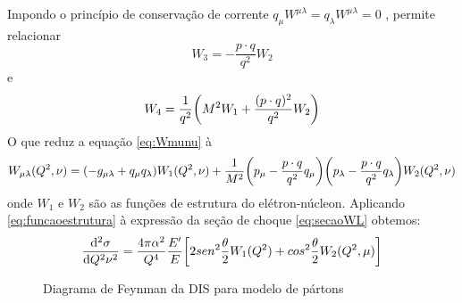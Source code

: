 Impondo o princípio de conservação de corrente $q_\mu W^{\mu\lambda} = q_ \lambda W^{\mu\lambda} = 0$ , permite relacionar
\begin{equation}
    W_ 3 = - \frac{p\cdot q}{q^2} W_ 2
\end{equation}
e
\begin{equation}
    W_ 4 = \frac{1}{q^2} \qty(M^2 W_1 + \frac{(p\cdot q) ^2}{q^2} W_ 2)
\end{equation}
O que reduz a equação \eqref{eq:Wmunu} à
\begin{equation}
    W_{\mu\lambda} (Q^2, \nu) =\qty (-g_{\mu\lambda} + q_\mu q_\lambda)W_ 1(Q^2,\nu) + \frac{1}{M^2} \qty(p_\mu - \frac{p\cdot q }{q^2}q_ \mu)\qty(p_\lambda - \frac{p\cdot q }{q^2}q_ \lambda) W_2(Q^2, \nu)
    \label{eq:funcaoestrutura}
\end{equation}
onde $W_1$ e $W_2$ são as funções de estrutura do elétron-núcleon. Aplicando \eqref{eq:funcaoestrutura} à expressão da seção de choque \eqref{eq:secaoWL} obtemos:
\begin{equation}
    \dv[2]{\sigma}{Q^2 \nu} = \frac{4\pi \alpha^2}{Q^4} \frac{E'}{E}\qty[2sen^2\frac{\theta}{2} W_1(Q^2) + cos^2\frac{\theta}{2}W_ 2 (Q^2,\mu)]
    \label{eq:crosssectiondis}
\end{equation}
\begin{figure}[!ht]
    \centering
    \caption{Diagrama de Feynman da DIS para modelo de pártons}
    \label{fig:disparton}
\end{figure}

